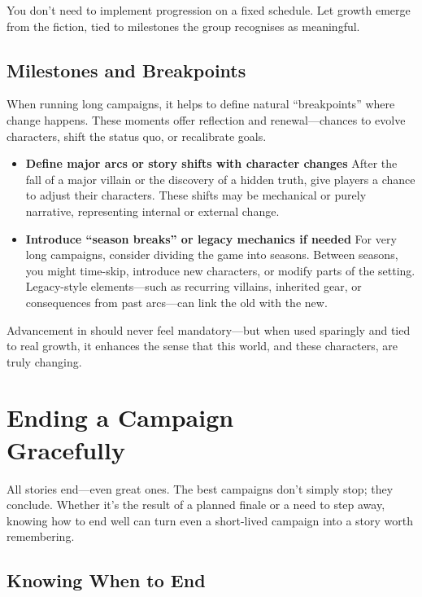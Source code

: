 You don’t need to implement progression on a fixed schedule. Let growth emerge from the fiction, tied to milestones the group recognises as meaningful.

\subsection*{Milestones and Breakpoints}

When running long campaigns, it helps to define natural “breakpoints” where change happens. These moments offer reflection and renewal—chances to evolve characters, shift the status quo, or recalibrate goals.

\begin{itemize}
    \item \textbf{Define major arcs or story shifts with character changes}  
    After the fall of a major villain or the discovery of a hidden truth, give players a chance to adjust their characters. These shifts may be mechanical or purely narrative, representing internal or external change.

    \item \textbf{Introduce “season breaks” or legacy mechanics if needed}  
    For very long campaigns, consider dividing the game into seasons. Between seasons, you might time-skip, introduce new characters, or modify parts of the setting. Legacy-style elements—such as recurring villains, inherited gear, or consequences from past arcs—can link the old with the new.
\end{itemize}

Advancement in \wyrd should never feel mandatory—but when used sparingly and tied to real growth, it enhances the sense that this world, and these characters, are truly changing.

\section[Ending a Campaign Gracefully]{Ending a Campaign\\ Gracefully}

All stories end—even great ones. The best campaigns don’t simply stop; they conclude. Whether it’s the result of a planned finale or a need to step away, knowing how to end well can turn even a short-lived campaign into a story worth remembering.

\subsection*{Knowing When to End}

